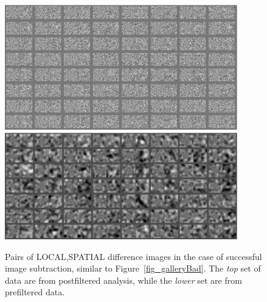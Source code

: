 \documentclass[prd, nofootinbib, floatfix, 11pt,tightenlines,times]{article}
\begin{document}
\begin{figure}
\begin{center}
\includegraphics[width=0.9\textwidth]{figures/normal2.eps} \\
\includegraphics[width=0.9\textwidth]{figures/preconv2.eps} \\
\end{center}
\caption{Pairs of LOCAL,SPATIAL difference images in the case of
  successful image subtraction, similar to
  Figure~\ref{fig_galleryBad}.  The {\it top} set of data are from
  postfiltered analysis, while the {\it lower} set are from
  prefiltered data.}
\label{fig_galleryGood}
\end{figure}
\end{document}
